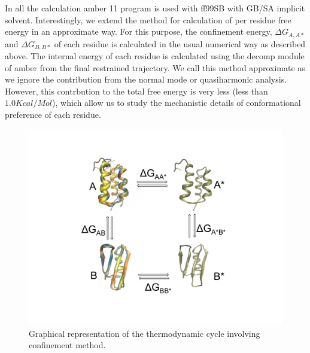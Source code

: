 \documentclass[12pt]{article}
\begin{document}
In all the calculation amber 11 program is used with ff99SB with GB/SA implicit solvent. Interestingly, we extend the
method for calculation of per residue free energy in an approximate way. For this purpose, the confinement energy, 
$\Delta G_{A,A*}$ and $\Delta G_{B,B*}$ of each residue is calculated in the usual numerical way as described above. The
internal energy of each residue is calculated using the decomp module of amber from the final restrained trajectory. We 
call this method approximate as we ignore the contribution from the normal mode or quasiharmonic analysis. 
However, this contrbution to the total free energy is very less (less than $1.0 Kcal/Mol$), which allow us to 
study the mechanistic details of conformational preference of each residue.      



\begin{figure}
\begin{center}
\includegraphics[width=3.5 in,height=3.5 in]{method.pdf}
\end{center}
\caption{Graphical representation of the thermodynamic cycle involving confinement method.}
\label{fig:method}
\end{figure}
\end{document}
